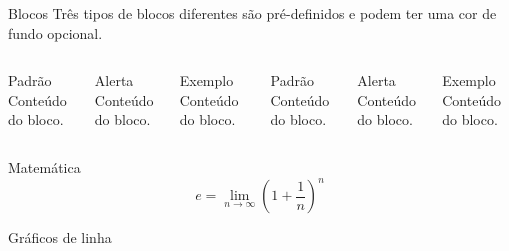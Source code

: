 \begin{frame}{Blocos}
  Três tipos de blocos diferentes são pré-definidos e podem ter uma
  cor de fundo opcional.

  \begin{columns}[T,onlytextwidth]
      \begin{block}{Padrão}
        Conteúdo do bloco.
      \end{block}

      \begin{alertblock}{Alerta}
        Conteúdo do bloco.
      \end{alertblock}

      \begin{exampleblock}{Exemplo}
        Conteúdo do bloco.
      \end{exampleblock}



      \begin{block}{Padrão}
        Conteúdo do bloco.
      \end{block}

      \begin{alertblock}{Alerta}
        Conteúdo do bloco.
      \end{alertblock}

      \begin{exampleblock}{Exemplo}
        Conteúdo do bloco.
      \end{exampleblock}

  \end{columns}
\end{frame}

\begin{frame}{Matemática}
  \begin{equation*}
    e = \lim_{n\to \infty} \left(1 + \frac{1}{n}\right)^n
  \end{equation*}
\end{frame}

\begin{frame}{Gráficos de linha}
  \begin{figure}
  \end{figure}
\end{frame}

